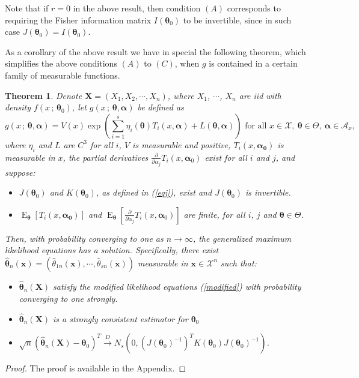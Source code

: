 \documentclass[12pt]{article} %
\newcommand{\f}{\operatorname}
\newcommand{\bs}{\boldsymbol}
\newtheorem{theorem}{Theorem}
\theoremstyle{definition}
\begin{document}
Note that if $r=0$ in the above result, then condition $(A)$ corresponds to requiring the Fisher information matrix $I(\bs{\theta}_0)$ to be invertible, since in such case $J(\bs{\theta}_0)=I(\bs{\theta}_0)$.

As a corollary of the above result we have in special the following theorem, which simplifies the above conditions $(A)$ to $(C)$, when $g$ is contained in a certain family of measurable functions.

\begin{theorem}\label{princ} Denote $\bs{X}=\left(X_1, X_2, \cdots, X_n\right)$, where $X_1$, $\cdots$, $X_n$ are iid with density $f(x\,;\,\bs{\theta}_0)$, let $g(x\,;\,\bs{\theta},\bs{\alpha})$ be defined as
\begin{equation*}g(x\,;\,\bs{\theta},\bs{\alpha})=V(x)\exp\left(\sum_{i=1}^s \eta_i(\bs{\theta})T_i(x,\bs{\alpha})+L(\bs{\theta},\bs{\alpha})\right)\mbox{ for all }x\in \mathcal{X},\ \bs{\theta}\in \Theta,\ \bs{\alpha}\in \mathcal{A}_x,
\end{equation*}
where $\eta_i$ and $L$ are $C^3$ for all $i$, $V$ is  measurable and positive,  $T_i(x,\bs{\alpha_0})$ is measurable in $x$, the partial derivatives $\frac{\partial}{\partial \alpha_j} T_i(x,\bs{\alpha}_0)$ exist for all $i$ and $j$, and suppose:
\begin{itemize}
\item[(A)]  $J(\bs{\theta}_0)$ and $K(\bs{\theta}_0)$, as defined in (\ref{eqj}), exist and $J(\bs{\theta}_0)$ is invertible.
\item[(B)] $\f{E}_{\bs{\theta}}\left[T_i(x,\bs{\alpha_0})\right]$ and $\f{E}_{\bs{\theta}}\left[\frac{\partial}{\partial \alpha_j} T_i(x,\bs{\alpha}_0)\right]$ are finite, for all $i$, $j$ and $\bs{\theta}\in \Theta$.
\end{itemize}
Then, with probability converging to one as $n\to \infty$, the generalized maximum likelihood equations has a solution. Specifically, there exist  $\bs{\hat{\theta}}_n(\bs{x})=(\hat{\theta}_{1n}(\bs{x}),\cdots,\hat{\theta}_{sn}(\bs{x}))$ measurable in $\bs{x}\in \mathcal{X}^n$ such that:
\begin{itemize}
\item[I)] $\bs{\hat{\theta}}_n(\bs{X})$ satisfy the modified likelihood equations (\ref{modified}) with probability converging to one strongly.
\item[II)] $\bs{\hat{\theta}}_n(\bs{X})$ is a strongly consistent estimator for $\bs{\theta}_0$
\item[III)]
$\sqrt{n}(\bs{\hat{\theta}}_n(\bs{X})-\bs{\theta}_0)^T\overset{D}{\to} N_s\left(0,(J(\bs{\theta}_0)^{-1})^T K(\bs{\theta}_0)J(\bs{\theta}_0)^{-1}\right)$.
\end{itemize}
\end{theorem}
\begin{proof} The proof is available in the Appendix.
 \end{proof}
\end{document}
